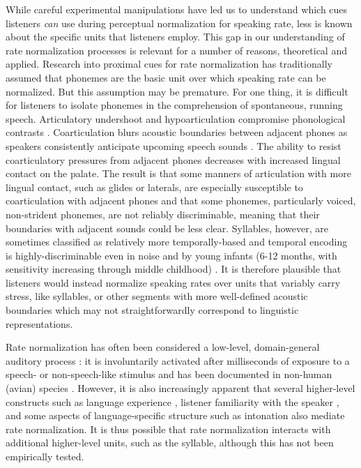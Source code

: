 \documentclass[preprint]{JASA}
\begin{document}
While careful experimental manipulations have led us to understand which cues listeners \textit{can} use during perceptual normalization for speaking rate, less is known about the specific units that listeners employ. This gap in our understanding of rate normalization processes is relevant for a number of reasons, theoretical and applied. Research into proximal cues for rate normalization has traditionally assumed that phonemes are the basic unit over which speaking rate can be normalized. But this assumption may be premature. For one thing, it is difficult for listeners to isolate phonemes in the comprehension of spontaneous, running speech. Articulatory undershoot and hypoarticulation compromise phonological contrasts \citep{johnsonHyperspaceEffectPhonetic1993,lindblomExplainingPhoneticVariation1990}. Coarticulation blurs acoustic boundaries between adjacent phones as speakers consistently anticipate upcoming speech sounds \citep{whalenCoarticulationLargelyPlanned1990}. The ability to resist coarticulatory pressures from adjacent phones decreases with increased lingual contact on the palate. The result is that some manners of articulation with more lingual contact, such as glides or laterals, are especially susceptible to coarticulation with adjacent phones \citep{recasensCoarticulatoryPatternsDegrees1985} and that some phonemes, particularly voiced, non-strident phonemes, are not reliably discriminable, meaning that their boundaries with adjacent sounds could be less clear. Syllables, however, are sometimes classified as relatively more temporally-based \citep{tilsenSpeechRhythmAnalysis2013} and temporal encoding is highly-discriminable even in noise \citep{giannelasamelliGapsinnoiseTestGap2008} and by young infants (6-12 months, with sensitivity increasing through middle childhood) \citep{trehubGapDetectionInfants1995}. It is therefore plausible that listeners would instead normalize speaking rates over units that variably carry stress, like syllables, or other segments with more well-defined acoustic boundaries which may not straightforwardly correspond to linguistic representations.

Rate normalization has often been considered a low-level, domain-general auditory process \citep{boskerAccountingRatedependentCategory2017,millerEffectsSpeakingRate1988}: it is involuntarily activated after milliseconds of exposure to a speech- \citep{reinischSpeakerspecificProcessingLocal2016} or non-speech-like stimulus and has been documented in non-human (avian) species \citep{welchEffectsSyllablefinalSegment2009}. However, it is also increasingly apparent that several higher-level constructs such as language experience \citep{baese-berkNonnativeSpeakersUse2016}, listener familiarity with the speaker \citep{kleinschmidtPerceptionVariableStructured2016,reinischSpeakerspecificProcessingLocal2016}, and some aspects of language-specific structure such as intonation \citep{steffmanIntonationalStructureMediates2019} also mediate rate normalization. It is thus possible that rate normalization interacts with additional higher-level units, such as the syllable, although this has not been empirically tested. 
\end{document}
